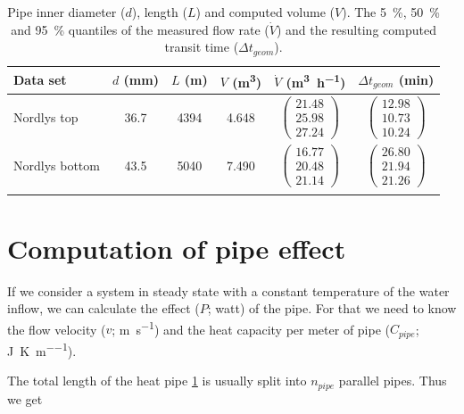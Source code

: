 \begin{table} [h]
\centering
\caption{Pipe inner diameter ($d$), length ($L$) and computed volume ($V$). The \SI{5}{\percent}, \SI{50}{\percent} and \SI{95}{\percent} quantiles of the measured flow rate ($\dot{V}$) and the resulting computed transit time ($\Delta t_{geom}$).}
\label{tab:vg-geometry}
\begin{tabular}{lccccc}
Data set & $d$ (\si{\milli\meter}) & $L$ (\si{\meter}) & $V$ (\si{\cubic\meter}) & $\dot{V}$ (\si{\cubic\meter\per\hour}) & $\Delta t_{geom}$ (\si{\minute})\\
\hline
\addlinespace[1.5ex]

Nordlys top    & \num{36.7} & \num{4394} & \num{4.648} &
  $\begin{pmatrix}  21.48\\ 25.98\\ 27.24 \end{pmatrix}$ &
  $\begin{pmatrix}  12.98\\ 10.73\\ 10.24 \end{pmatrix}$ \\
\addlinespace[2.0ex]

Nordlys bottom & \num{43.5} & \num{5040} & \num{7.490} &
  $\begin{pmatrix}  16.77\\ 20.48\\ 21.14 \end{pmatrix}$ &
  $\begin{pmatrix}  26.80\\ 21.94\\ 21.26 \end{pmatrix}$\\
  
\addlinespace[1.0ex]
\hline
\end{tabular}
\end{table}

\FloatBarrier
\section{Computation of pipe effect}
If we consider a system in steady state with a constant temperature of the water inflow, we can calculate the effect ($P$; \si{watt}) of the pipe. For that we need to know the flow velocity ($v$; \si{\meter\per\second}) and the heat capacity per meter of pipe ($C_{pipe}$; \si{\joule\per\kelvin\per\meter}).

The total length of the heat pipe \cref{tab:vg-geometry} is usually split into $n_{pipe}$ parallel pipes. Thus we get

